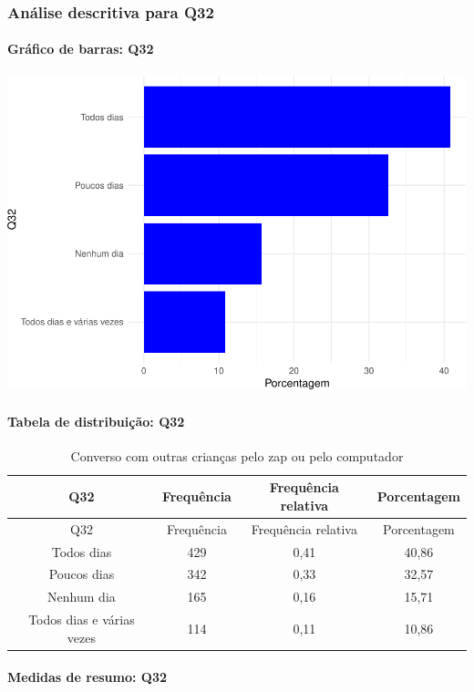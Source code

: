 \documentclass[]{article}
\let\oldparagraph\paragraph
\renewcommand{\paragraph}[1]{\oldparagraph{#1}\mbox{}}
\begin{document}
\hypertarget{anuxe1lise-descritiva-para-q32}{%
\subsubsection{Análise descritiva para Q32}\label{anuxe1lise-descritiva-para-q32}}

\hypertarget{gruxe1fico-de-barras-q32}{%
\paragraph{Gráfico de barras: Q32}\label{gruxe1fico-de-barras-q32}}

\begin{center}\includegraphics[width=0.75\linewidth]{relatorio_covid19_files/figure-latex/unnamed-chunk-1071-1} \end{center}

\hypertarget{tabela-de-distribuiuxe7uxe3o-q32}{%
\paragraph{Tabela de distribuição: Q32}\label{tabela-de-distribuiuxe7uxe3o-q32}}

\begin{longtable}[]{@{}cccc@{}}
\caption{\label{tab:unnamed-chunk-1072}Converso com outras crianças pelo zap ou pelo computador}\tabularnewline
\toprule
Q32 & Frequência & Frequência relativa & Porcentagem\tabularnewline
\midrule
\endfirsthead
\toprule
Q32 & Frequência & Frequência relativa & Porcentagem\tabularnewline
\midrule
\endhead
Todos dias & 429 & 0,41 & 40,86\tabularnewline
Poucos dias & 342 & 0,33 & 32,57\tabularnewline
Nenhum dia & 165 & 0,16 & 15,71\tabularnewline
Todos dias e várias vezes & 114 & 0,11 & 10,86\tabularnewline
\bottomrule
\end{longtable}

\hypertarget{medidas-de-resumo-q32}{%
\paragraph{Medidas de resumo: Q32}\label{medidas-de-resumo-q32}}
\end{document}
